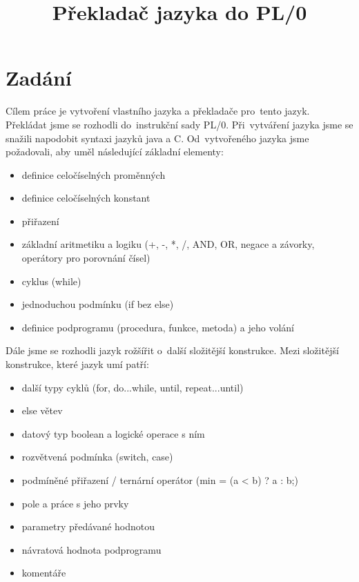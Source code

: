 \documentclass[czech]{thesiskiv}
\title{Překladač jazyka do PL/0}
\begin{document}
%
\maketitle
\thispagestyle{empty} 
\pagestyle{empty}
\tableofcontents
{}

\chapter{Zadání}
\label{sec:zadani}
\pagestyle{plain}
\setcounter{page}{1}
Cílem práce je vytvoření vlastního jazyka a překladače pro~tento jazyk.
Překládat jsme se rozhodli do~instrukční sady PL/0.
Při~vytváření jazyka jsme se snažili napodobit syntaxi jazyků java a C.
Od~vytvořeného jazyka jsme požadovali, aby uměl následující základní elementy:

\begin{itemize}
\item definice celočíselných proměnných
\item definice celočíselných konstant
\item přiřazení
\item základní aritmetiku a logiku (+, -, *, /, AND, OR, negace a závorky, operátory pro porovnání čísel)
\item cyklus (while)
\item jednoduchou podmínku (if bez else)
\item definice podprogramu (procedura, funkce, metoda) a jeho volání
\end{itemize}

\noindent Dále jsme se rozhodli jazyk rožšířit o~další složitější konstrukce.
Mezi složitější konstrukce, které jazyk umí patří:

\begin{itemize}
\item další typy cyklů (for, do...while, until, repeat...until)
\item else větev
\item datový typ boolean a logické operace s ním
\item rozvětvená podmínka (switch, case)
\item podmíněné přiřazení / ternární operátor (min = (a < b) ? a : b;)
\item pole a práce s jeho prvky
\item parametry předávané hodnotou
\item návratová hodnota podprogramu
\item komentáře
\end{itemize}
\end{document}
